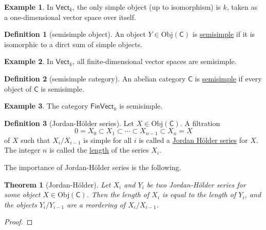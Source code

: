 \documentclass[a4paper,10pt]{scrreprt}
\newcommand{\defn}[1]{\ul{#1}}
\newcommand{\Obj}{\mathrm{Obj}}
\theoremstyle{definition}
\newtheorem{definition}{Definition}[section]
\newtheorem{example}{Example}[section]
\theoremstyle{plain}
\newtheorem{theorem}{Theorem}[section]
\theoremstyle{remark}
\begin{document}
\begin{example}
  In $\mathsf{Vect}_{k}$, the only simple object (up to isomorphism) is $k$, taken as a one-dimensional vector space over itself.
\end{example}

\begin{definition}[semisimple object]
  \label{def:semisimpleobject}
  An object $Y \in \Obj(\mathsf{C})$ is \defn{semisimple} if it is isomorphic to a dirct sum of simple objects.
\end{definition}

\begin{example}
  In $\mathsf{Vect}_{k}$, all finite-dimensional vector spaces are semisimple.
\end{example}

\begin{definition}[semisimple category]
  \label{def:semisimple category}
  An abelian category $\mathsf{C}$ is \defn{semisimple} if every object of $\mathsf{C}$ is semisimple.
\end{definition}

\begin{example}
  The category $\mathsf{FinVect}_{k}$ is semisimple.
\end{example}

\begin{definition}[Jordan-H{\"o}lder series]
  \label{def:jordanholderseries}
  Let $X \in \Obj(\mathsf{C})$. A filtration 
  \begin{equation*}
    0 = X_{0} \subset X_{1} \subset \cdots \subset X_{n-1} \subset X_{n} = X
  \end{equation*}
  of $X$ such that $X_{i} / X_{i-1}$ is simple for all $i$ is called a \defn{Jordan H{\"o}lder series} for $X$. The integer $n$ is called the \defn{length} of the series $X_{i}$.
\end{definition}

The importance of Jordan-H{\"o}lder series is the following.

\begin{theorem}[Jordan-H{\"o}lder]
  \label{thm:jordanholdertheorem}
  Let $X_{i}$ and $Y_{i}$ be two Jordan-H{\"o}lder series for some object $X \in \Obj(\mathsf{C})$. Then the length of $X_{i}$ is equal to the length of $Y_{i}$, and the objects $Y_{i}/Y_{i-1}$ are a reordering of $X_{i}/X_{i-1}$.
\end{theorem}
\begin{proof}

\end{proof}
\end{document}
